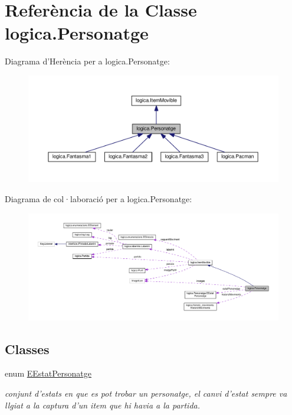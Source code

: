 \hypertarget{classlogica_1_1_personatge}{\section{Referència de la Classe logica.\+Personatge}
\label{classlogica_1_1_personatge}
}


Diagrama d'Herència per a logica.\+Personatge\+:\nopagebreak
\begin{figure}[H]
\begin{center}
\leavevmode
\includegraphics[width=350pt]{classlogica_1_1_personatge__inherit__graph}
\end{center}
\end{figure}


Diagrama de col·laboració per a logica.\+Personatge\+:
\nopagebreak
\begin{figure}[H]
\begin{center}
\leavevmode
\includegraphics[width=350pt]{classlogica_1_1_personatge__coll__graph}
\end{center}
\end{figure}
\subsection*{Classes}
\begin{DoxyCompactItemize}
\item 
enum \hyperlink{enumlogica_1_1_personatge_1_1_e_estat_personatge}{E\+Estat\+Personatge}
\begin{DoxyCompactList}\small\item\em conjunt d'estats en que es pot trobar un personatge, el canvi d'estat sempre va llgiat a la captura d'un item que hi havia a la partida. \end{DoxyCompactList}\end{DoxyCompactItemize}
